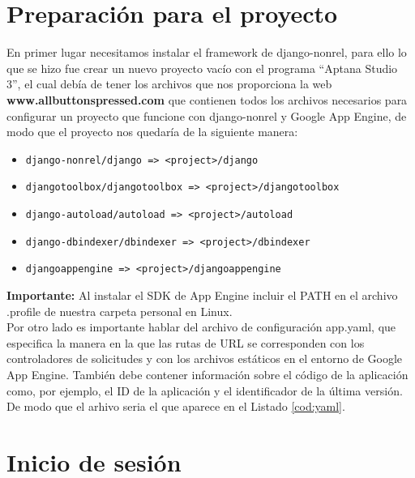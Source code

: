 \section{Preparación para el proyecto}
\label{4:sec3}

En primer lugar necesitamos instalar el framework de django-nonrel, para ello lo que se hizo fue crear un nuevo proyecto vacío con el 
programa ``Aptana Studio 3'', el cual debía de tener los archivos que nos proporciona la web \textbf{www.allbuttonspressed.com} \cite{URL:DjangoNonrel} que contienen 
todos los archivos necesarios para configurar un proyecto que funcione con django-nonrel y Google App Engine, 
de modo que el proyecto nos quedaría de la siguiente manera:

\begin{itemize}
  \item \lstinline!django-nonrel/django => <project>/django!
  \item \lstinline!djangotoolbox/djangotoolbox => <project>/djangotoolbox!
  \item \lstinline!django-autoload/autoload => <project>/autoload!
  \item \lstinline!django-dbindexer/dbindexer => <project>/dbindexer!
  \item \lstinline!djangoappengine => <project>/djangoappengine!
\end{itemize}

\textbf{Importante:} Al instalar el SDK de App Engine incluir el PATH en el archivo .profile de nuestra carpeta personal en Linux.\\

Por otro lado es importante hablar del archivo de configuración app.yaml, que especifica la manera en la que las rutas de URL se corresponden con los 
controladores de solicitudes y con los archivos estáticos en el entorno de Google App Engine. 
También debe contener información sobre el código de la aplicación como, por ejemplo, el ID de la aplicación y el identificador de la última versión.\\

De modo que el arhivo seria el que aparece en el Listado \ref{cod:yaml}.\\



\section{Inicio de sesión}
\label{4:sec4}


